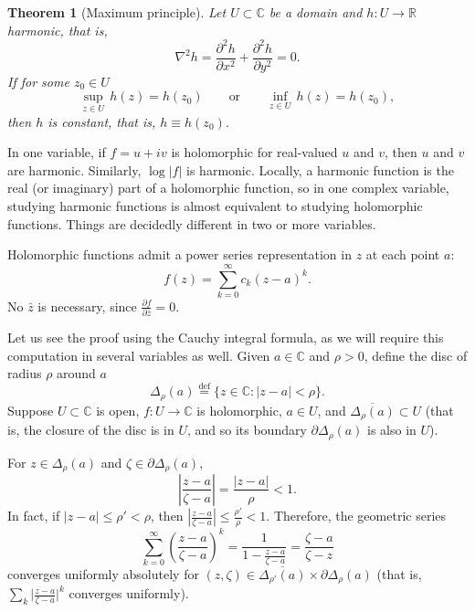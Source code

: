 \documentclass[12pt,openany]{book}
\newcommand{\sabs}[1]{\lvert {#1} \rvert}
\newcommand{\abs}[1]{\left\lvert {#1} \right\rvert}
\newcommand{\C}{{\mathbb{C}}}
\newcommand{\R}{{\mathbb{R}}}
\theoremstyle{plain}
\newtheorem{thm}{Theorem}[section]
\theoremstyle{remark}
\theoremstyle{definition}
\theoremstyle{exercise}
\theoremstyle{example}
\begin{document}
\begin{thm}[Maximum principle]
\pagebreak[2]
Let $U \subset \C$ be a domain and $h \colon U \to \R$
harmonic, that is,
%
\begin{equation*}
\nabla^2 h = \frac{\partial^2 h}{\partial x^2} + \frac{\partial^2 h}{\partial
y^2} = 0 .
\end{equation*}
If for some $z_0 \in U$
\begin{equation*}
\sup_{z \in U} \, h(z) = h(z_0)
\qquad \text{or} \qquad
\inf_{z \in U} \, h(z) = h(z_0) ,
\end{equation*}
then $h$ is constant, that is, $h \equiv h(z_0)$.
\end{thm}

In one variable, if $f = u+iv$ is holomorphic for real-valued $u$ and $v$,
then $u$ and $v$ are harmonic.
Similarly, $\log \sabs{f}$ is harmonic.
Locally, a harmonic function is
the real (or imaginary) part of a holomorphic function, so in
one complex variable, studying
harmonic functions is almost equivalent to studying holomorphic
functions.  Things are decidedly different
in two or more variables.

\medskip

Holomorphic functions admit a power series representation in $z$
at each point $a$:
\begin{equation*}
f(z) = \sum_{k=0}^\infty c_k {(z-a)}^k .
\end{equation*}
No $\bar{z}$ is necessary,
since $\frac{\partial f}{\partial \bar{z}} = 0$.

Let us see the proof using the Cauchy integral formula, as we will
require this computation in several variables as well.
Given $a \in \C$ and $\rho > 0$, define the disc of radius $\rho$ around $a$
%
\begin{equation*}
\Delta_\rho(a)
\overset{\text{def}}{=}
\bigl\{ z \in \C : \sabs{z-a} < \rho \bigr\} .
\end{equation*}
Suppose $U \subset \C$ is open, $f \colon U \to \C$ is holomorphic,
$a \in U$, and $\overline{\Delta_\rho(a)} \subset U$ (that is, the closure
of the disc is in $U$, and so its boundary $\partial \Delta_\rho(a)$ is also in $U$).

For $z \in \Delta_\rho(a)$ and $\zeta \in \partial \Delta_\rho(a)$,
\begin{equation*}
\abs{\frac{z-a}{\zeta-a}} =
\frac{\sabs{z-a}}{\rho} < 1 .
\end{equation*}
In fact, if $\sabs{z-a} \leq \rho' < \rho$, then
$\abs{\frac{z-a}{\zeta-a}} \leq \frac{\rho'}{\rho} < 1$.  Therefore,
the geometric series
\begin{equation*}
\sum_{k=0}^\infty
{\left(\frac{z-a}{\zeta-a}\right)}^k
=
\frac{1}{1-
\frac{z-a}{\zeta-a}}
=
\frac{\zeta-a}{\zeta-z}
\end{equation*}
converges uniformly absolutely for $(z,\zeta) \in \overline{\Delta_{\rho'}(a)}
\times \partial \Delta_\rho(a)$ (that is, $\sum_k {\bigl\lvert
\frac{z-a}{\zeta-a} \bigr\rvert}^k$
converges uniformly).
\end{document}
